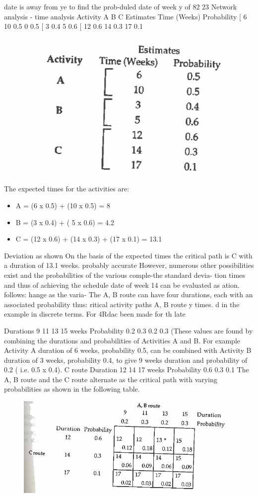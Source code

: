 \documentclass[]{report}
\begin{document}
date is away from 
ye to find the prob-duled date of week 
y of 82%
23 Network analysis - time analysis Activity A B C Estimates Time (Weeks) Probability [ 6 10 0.5 0  0.5 [ 3 0.4 5 0.6 [ 12 0.6 14 0.3 17 0.1 

\begin{figure}
\centering
\includegraphics[width=0.4\linewidth]{images4/339-a}
\caption{}
\label{fig:339-a}
\end{figure}


The expected times for the activities are: 
\begin{itemize}
	\item A = (6 x 0.5) + (10 x 0.5) = 8 
	\item B = (3 x 0.4) + ( 5 x 0.6) = 4.2 
	\item C = (12 x 0.6) + (14 x 0.3) + (17 x 0.1) = 13.1 
\end{itemize}

Deviation as shown On the basis of the expected times the critical path is C with a duration of 13.1 weeks. probably accurate However, numerous other possibilities exist and the probabilities of the various comple-the standard devia- tion times and thus of achieving the schedule date of week 14 can be evaluated as ation. follows: hange as the varia- The A, B route can have four durations, each with an associated probability thus: ritical activity paths A, B route y times. 
d in the example in discrete terms. For 
4Rdac been made for th 
late 

Durations 9 11 13 15 weeks Probability 0.2 0.3 0.2 0.3 
(These values are found by combining the durations and probabilities of Activities A and B. For example Activity A duration of 6 weeks, probability 0.5, can be combined with Activity B duration of 3 weeks, probability 0.4, to give 9 weeks duration and probability of 0.2 ( i.e. 0.5 x 0.4). C route 
Duration 12 14 17 weeks Probability 0.6 0.3 0.1 
The A, B route and the C route alternate as the critical path with varying probabilities as shown in the following table. 
\begin{figure}
\centering
\includegraphics[width=0.4\linewidth]{images4/339-b}
\caption{}
\label{fig:339-b}
\end{figure}
\end{document}
